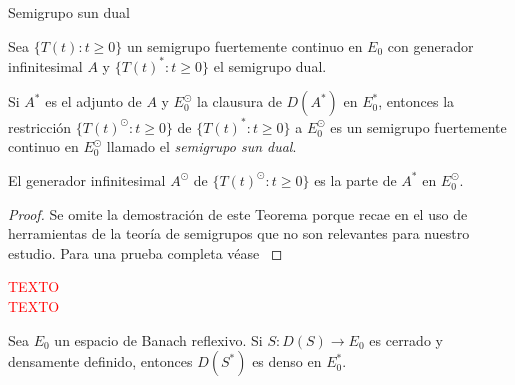 \begin{Teorema}{Semigrupo sun dual}
    \label{ch:semigrupos:section:dual:th:SunDual}

    Sea $\{T(t) : t \geq 0 \}$ un semigrupo fuertemente continuo en $E_0$ con generador infinitesimal $A$ y $\{T(t)^* : t \geq 0 \}$ el semigrupo dual.

    Si $A^*$ es el adjunto de $A$ y $E_0^{\odot}$ la clausura de $D(A^*)$ en $E^*_0$, entonces la restricción $\{T(t)^\odot : t \geq 0\}$ de $\{T(t)^* : t \geq 0\}$ a $E_0^\odot$ es un semigrupo fuertemente continuo en $E_0^\odot$ llamado el \textit{semigrupo sun dual}.

    El generador infinitesimal $A^\odot$ de $\{T(t)^\odot : t \geq 0\}$ es la parte de $A^*$ en $E_0^\odot$.
\end{Teorema}

\begin{proof}
    Se omite la demostración de este Teorema porque recae en el uso de herramientas de la teoría de semigrupos que no son  relevantes para nuestro estudio. Para una prueba completa véase \cite[Teorema~1.6.1]{carvalho-2001-equ-par-sem}
\end{proof}

\textcolor{red}{TEXTO}\\

\textcolor{red}{TEXTO}\\

\begin{Lema}
    \label{ch:semigrupos:section:dual:lemma:densidadDelDomAdjuntoDelGenerador}

    Sea $E_0$ un espacio de Banach reflexivo. Si $S : D(S) \rightarrow E_0$ es cerrado y densamente definido, entonces $D(S^*)$ es denso en $E_0^*$.
\end{Lema}

